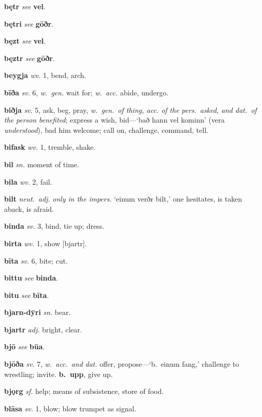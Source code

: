 \documentclass[12pt,letterpaper]{book}
\begin{document}
\noindent
\textbf{bętr} \textit{} \textit{see} \textbf{vel}.

\noindent
\textbf{bętri} \textit{} \textit{see} \textbf{gōðr}.

\noindent
\textbf{bęzt} \textit{} \textit{see} \textbf{vel}.

\noindent
\textbf{bęztr} \textit{} \textit{see} \textbf{gōðr}.

\noindent
\textbf{beygja} \textit{wv.} 1, bend, arch.

\noindent
\textbf{bīða} \textit{sv.} 6, \textit{w.\ gen.} wait for; \textit{w.\ acc.}
	abide, undergo.

\noindent
\textbf{biðja} \textit{sv.} 5, ask, beg, pray, \textit{w.\ gen.\ of thing, acc.
	of the pers.\ asked, and dat.\ of the person benefited}; express a
    wish, bid---`bað hann vel kominn' (vera \textit{understood}), bad
    him welcome; call on, challenge, command, tell.

\noindent
\textbf{bifask} \textit{wv.} 1, tremble, shake.

\noindent
\textbf{bil} \textit{sn.} moment of time.

\noindent
\textbf{bila} \textit{wv.} 2, fail.

\noindent
\textbf{bilt} \textit{neut.\ adj.} \textit{only in the impers.} `einum verðr
	bilt,' one hesitates, is taken aback, is afraid.

\noindent
\textbf{binda} \textit{sv.} 3, bind, tie up; dress.

\noindent
\textbf{birta} \textit{wv.} 1, show [bjartr].

\noindent
\textbf{bīta} \textit{sv.} 6, bite; cut.

\noindent
\textbf{bittu} \textit{} \textit{see} \textbf{binda}.

\noindent
\textbf{bitu} \textit{} \textit{see} \textbf{bīta}.

\noindent
\textbf{bjarn-dȳri} \textit{sn.} bear.

\noindent
\textbf{bjartr} \textit{adj.} bright, clear.

\noindent
\textbf{bjō} \textit{} \textit{see} \textbf{būa}.

\noindent
\textbf{bjōða} \textit{sv.} 7, \textit{w.\ acc.\ and dat.} offer,
	propose---`b.\ einum fang,' challenge to wrestling; invite.
	\textbf{b.\ upp}, give up.

\noindent
\textbf{bjǫrg} \textit{sf.} help; means of subsistence, store of food.

\noindent
\textbf{blāsa} \textit{sv.} 1, blow; blow trumpet as signal.
\end{document}
